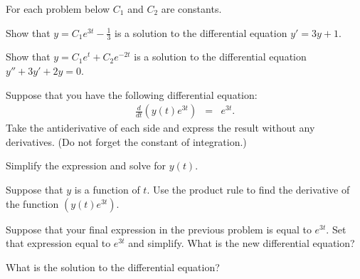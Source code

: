   For each problem below $C_1$ and $C_2$ are constants.
  \begin{problem}

  \item Show that $y=C_1 e^{3t}-\frac{1}{3}$ is a solution to the
    differential equation $y'=3y+1$.
    \vfill

  \item Show that $y=C_1 e^{t} + C_2 e^{-2t}$ is a solution to the
    differential equation $y''+3y'+2y=0$.

    \vfill

    \clearpage

  \item Suppose that you have the following differential equation:
    \begin{eqnarray*}
      \frac{d}{dt} \left( y(t) e^{3t} \right) & = & e^{3t}.
    \end{eqnarray*}
    Take the antiderivative of each side and express the result
    without any derivatives. (Do not forget the constant of
    integration.)  
    
    \vfill

  \item Simplify the expression and solve for $y(t)$. 
    \vfill

    \clearpage

  \item Suppose that $y$ is a function of $t$. Use the product rule to
    find the derivative of the function $\left(y(t) e^{3t}\right)$.
    \vfill

  \item Suppose that your final expression in the previous problem is
    equal to $e^{3t}$.  Set that expression equal to $e^{3t}$ and
    simplify. What is the new differential equation?  \vfill

  \item What is the solution to the differential equation?

\end{problem}

